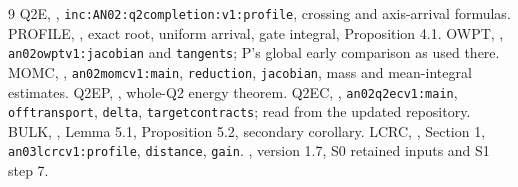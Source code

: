 \documentclass[11pt]{article}
\theoremstyle{remark}\newtheorem{remark}[theorem]{Remark}
\begin{document}
\begin{thebibliography}{9}\small
{} Q2E, ,
\texttt{inc:AN02:q2completion:v1:profile}, crossing and axis-arrival formulas.
 PROFILE,
,
exact root, uniform arrival, gate integral, Proposition 4.1.
 OWPT,
,
\texttt{an02owptv1:jacobian} and \texttt{tangents}; P's global early comparison as used there.
 MOMC,
,
\texttt{an02momcv1:main}, \texttt{reduction}, \texttt{jacobian},
mass and mean-integral estimates.
 Q2EP,
,
whole-Q2 energy theorem.
 Q2EC, ,
\texttt{an02q2ecv1:main}, \texttt{offtransport},
\texttt{delta}, \texttt{targetcontracts}; read from the updated repository.
 BULK,
,
Lemma 5.1, Proposition 5.2, secondary corollary.
 LCRC,
, Section 1,
\texttt{an03lcrcv1:profile}, \texttt{distance}, \texttt{gain}.
 ,
version 1.7, S0 retained inputs and S1 step 7.
\end{thebibliography}
\end{document}
